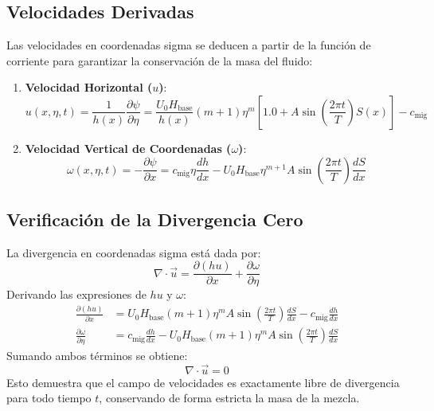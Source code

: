 \documentclass[11pt,a4paper]{article}
\begin{document}
\subsection{Velocidades Derivadas}
Las velocidades en coordenadas sigma se deducen a partir de la función de corriente para garantizar la conservación de la masa del fluido:

\begin{enumerate}
    \item \textbf{Velocidad Horizontal (\(u\))}:
    \begin{equation}
    u(x, \eta, t) = \frac{1}{h(x)} \frac{\partial \psi}{\partial \eta} = \frac{U_0 H_{\text{base}}}{h(x)} (m+1) \eta^m \left[ 1.0 + A \sin\left(\frac{2\pi t}{T}\right) S(x) \right] - c_{\text{mig}}
    \end{equation}
    
    \item \textbf{Velocidad Vertical de Coordenadas (\(\omega\))}:
    \begin{equation}
    \omega(x, \eta, t) = -\frac{\partial \psi}{\partial x} = c_{\text{mig}} \eta \frac{dh}{dx} - U_0 H_{\text{base}} \eta^{m+1} A \sin\left(\frac{2\pi t}{T}\right) \frac{dS}{dx}
    \end{equation}
\end{enumerate}

\subsection{Verificación de la Divergencia Cero}
La divergencia en coordenadas sigma está dada por:
\begin{equation}
\nabla \cdot \vec{u} = \frac{\partial (h u)}{\partial x} + \frac{\partial \omega}{\partial \eta}
\end{equation}
Derivando las expresiones de $h u$ y $\omega$:
\begin{align}
\frac{\partial (h u)}{\partial x} &= U_0 H_{\text{base}} (m+1) \eta^m A \sin\left(\frac{2\pi t}{T}\right) \frac{dS}{dx} - c_{\text{mig}} \frac{dh}{dx} \\
\frac{\partial \omega}{\partial \eta} &= c_{\text{mig}} \frac{dh}{dx} - U_0 H_{\text{base}} (m+1) \eta^m A \sin\left(\frac{2\pi t}{T}\right) \frac{dS}{dx}
\end{align}
Sumando ambos términos se obtiene:
\begin{equation}
\nabla \cdot \vec{u} = 0
\end{equation}
Esto demuestra que el campo de velocidades es exactamente libre de divergencia para todo tiempo $t$, conservando de forma estricta la masa de la mezcla.
\end{document}
